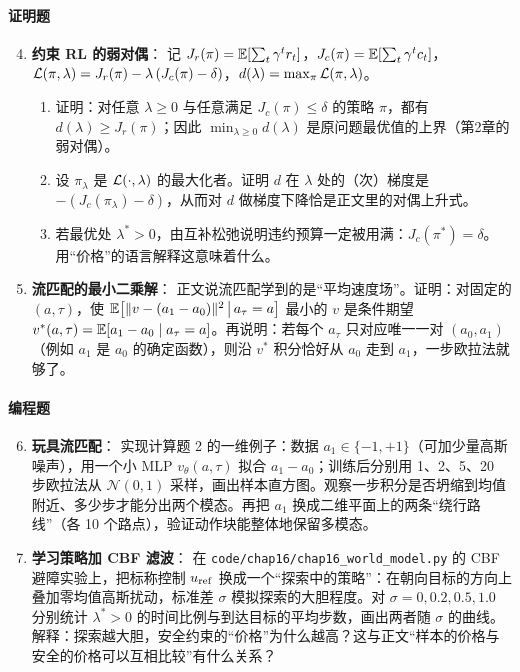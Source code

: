 \paragraph{证明题}
\begin{enumerate}
    \setcounter{enumi}{3}
    \item \textbf{约束 RL 的弱对偶}：
    记 $J_r(\pi) = \mathbb{E}[\sum_t \gamma^t r_t]$，$J_c(\pi) = \mathbb{E}[\sum_t \gamma^t c_t]$，$\mathcal{L}(\pi, \lambda) = J_r(\pi) - \lambda\,(J_c(\pi) - \delta)$，$d(\lambda) = \max_\pi \mathcal{L}(\pi, \lambda)$。
    \begin{enumerate}
        \item 证明：对任意 $\lambda \ge 0$ 与任意满足 $J_c(\pi) \le \delta$ 的策略 $\pi$，都有 $d(\lambda) \ge J_r(\pi)$；因此 $\min_{\lambda \ge 0} d(\lambda)$ 是原问题最优值的上界（第2章的弱对偶）。
        \item 设 $\pi_\lambda$ 是 $\mathcal{L}(\cdot, \lambda)$ 的最大化者。证明 $d$ 在 $\lambda$ 处的（次）梯度是 $-(J_c(\pi_\lambda) - \delta)$，从而对 $d$ 做梯度下降恰是正文里的对偶上升式。
        \item 若最优处 $\lambda^* > 0$，由互补松弛说明违约预算一定被用满：$J_c(\pi^*) = \delta$。用“价格”的语言解释这意味着什么。
    \end{enumerate}

    \item \textbf{流匹配的最小二乘解}：
    正文说流匹配学到的是“平均速度场”。证明：对固定的 $(a, \tau)$，使 $\mathbb{E}\big[\|v - (a_1 - a_0)\|^2 \,\big|\, a_\tau = a\big]$ 最小的 $v$ 是条件期望 $v^*(a, \tau) = \mathbb{E}[a_1 - a_0 \mid a_\tau = a]$。再说明：若每个 $a_\tau$ 只对应唯一一对 $(a_0, a_1)$（例如 $a_1$ 是 $a_0$ 的确定函数），则沿 $v^*$ 积分恰好从 $a_0$ 走到 $a_1$，一步欧拉法就够了。
\end{enumerate}

\paragraph{编程题}
\begin{enumerate}
    \setcounter{enumi}{5}
    \item \textbf{玩具流匹配}：
    实现计算题 2 的一维例子：数据 $a_1 \in \{-1, +1\}$（可加少量高斯噪声），用一个小 MLP $v_\theta(a, \tau)$ 拟合 $a_1 - a_0$；训练后分别用 1、2、5、20 步欧拉法从 $\mathcal{N}(0, 1)$ 采样，画出样本直方图。观察一步积分是否坍缩到均值附近、多少步才能分出两个模态。再把 $a_1$ 换成二维平面上的两条“绕行路线”（各 10 个路点），验证动作块能整体地保留多模态。

    \item \textbf{学习策略加 CBF 滤波}：
    在 \texttt{code/chap16/chap16\_world\_model.py} 的 CBF 避障实验上，把标称控制 $u_{\rm ref}$ 换成一个“探索中的策略”：在朝向目标的方向上叠加零均值高斯扰动，标准差 $\sigma$ 模拟探索的大胆程度。对 $\sigma = 0, 0.2, 0.5, 1.0$ 分别统计 $\lambda^* > 0$ 的时间比例与到达目标的平均步数，画出两者随 $\sigma$ 的曲线。解释：探索越大胆，安全约束的“价格”为什么越高？这与正文“样本的价格与安全的价格可以互相比较”有什么关系？
\end{enumerate}

